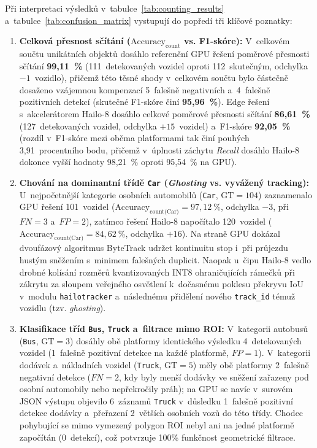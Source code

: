 Při interpretaci výsledků v~tabulce~\ref{tab:counting_results} a~tabulce~\ref{tab:confusion_matrix} vystupují do popředí tři klíčové poznatky:
\begin{enumerate}
    \item \textbf{Celková přesnost sčítání ($\text{Accuracy}_{\text{count}}$ vs. F1-skóre):} V~celkovém součtu unikátních objektů dosáhlo referenční GPU řešení poměrové přesnosti sčítání \textbf{99,11~\%} (111~detekovaných vozidel oproti 112~skutečným, odchylka $-1$~vozidlo), přičemž této těsné shody v~celkovém součtu bylo částečně dosaženo vzájemnou kompenzací 5~falešně negativních a~4~falešně pozitivních detekcí (skutečné F1-skóre činí \textbf{95,96~\%}). Edge řešení s~akcelerátorem Hailo-8 dosáhlo celkové poměrové přesnosti sčítání \textbf{86,61~\%} (127~detekovaných vozidel, odchylka $+15$~vozidel) a~F1-skóre \textbf{92,05~\%} (rozdíl v~F1-skóre mezi oběma platformami tak činí pouhých 3,91~procentního bodu, přičemž v~úplnosti záchytu \textit{Recall} dosáhlo Hailo-8 dokonce vyšší hodnoty 98,21~\% oproti 95,54~\% na GPU).
    \item \textbf{Chování na dominantní třídě \texttt{Car} (\textit{Ghosting} vs. vyvážený tracking):} U~nejpočetnější kategorie osobních automobilů (\texttt{Car}, $\text{GT} = 104$) zaznamenalo GPU řešení 101~vozidel ($\text{Accuracy}_{\text{count(Car)}} = 97{,}12~\%$, odchylka $-3$, při $FN = 3$ a~$FP = 2$), zatímco řešení Hailo-8 napočítalo 120~vozidel ($\text{Accuracy}_{\text{count(Car)}} = 84{,}62~\%$, odchylka $+16$). Na straně GPU dokázal dvoufázový algoritmus ByteTrack udržet kontinuitu stop i~při průjezdu hustým sněžením s~minimem falešných duplicit. Naopak u~čipu Hailo-8 vedlo drobné kolísání rozměrů kvantizovaných INT8 ohraničujících rámečků při zákrytu za sloupem veřejného osvětlení k~dočasnému poklesu překryvu \acs{IoU} v~modulu \texttt{hailotracker} a~následnému přidělení nového \texttt{track\_id} témuž vozidlu (tzv. \textit{ghosting}).
    \item \textbf{Klasifikace tříd \texttt{Bus}, \texttt{Truck} a~filtrace mimo ROI:} V~kategorii autobusů (\texttt{Bus}, $\text{GT} = 3$) dosáhly obě platformy identického výsledku 4~detekovaných vozidel (1~falešně pozitivní detekce na každé platformě, $FP = 1$). V~kategorii dodávek a~nákladních vozidel (\texttt{Truck}, $\text{GT} = 5$) měly obě platformy 2~falešně negativní detekce ($FN = 2$, kdy byly menší dodávky ve sněžení zařazeny pod osobní automobily nebo nepřekročily práh); na GPU se navíc v~surovém JSON výstupu objevilo 6~záznamů \texttt{Truck} v~důsledku 1~falešně pozitivní detekce dodávky a~přeřazení 2~větších osobních vozů do této třídy. Chodec pohybující se mimo vymezený polygon ROI nebyl ani na jedné platformě započítán ($0$~detekcí), což potvrzuje 100\% funkčnost geometrické filtrace.
\end{enumerate}

